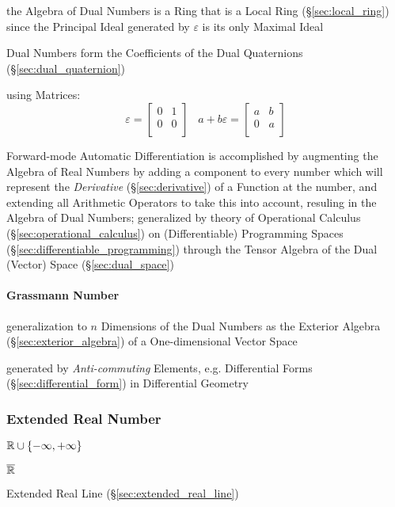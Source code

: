 the Algebra of Dual Numbers is a Ring that is a Local Ring
(\S\ref{sec:local_ring}) since the Principal Ideal generated by $\varepsilon$ is
its only Maximal Ideal

Dual Numbers form the Coefficients of the Dual Quaternions
(\S\ref{sec:dual_quaternion})

using Matrices:
\[
  \varepsilon = \begin{bmatrix}
    0 & 1 \\
    0 & 0 \\
  \end{bmatrix}
  \;\;\;
  a + b\varepsilon = \begin{bmatrix}
    a & b \\
    0 & a \\
  \end{bmatrix}
\]

Forward-mode Automatic Differentiation is accomplished by augmenting the Algebra
of Real Numbers by adding a component to every number which will represent the
\emph{Derivative} (\S\ref{sec:derivative}) of a Function at the number, and
extending all Arithmetic Operators to take this into account, resuling in the
Algebra of Dual Numbers; generalized by theory of Operational Calculus
(\S\ref{sec:operational_calculus}) on (Differentiable) Programming Spaces
(\S\ref{sec:differentiable_programming}) through the Tensor Algebra of the Dual
(Vector) Space (\S\ref{sec:dual_space})



\paragraph{Grassmann Number}\label{sec:grassmann_number}\hfill

generalization to $n$ Dimensions of the Dual Numbers as the Exterior Algebra
(\S\ref{sec:exterior_algebra}) of a One-dimensional Vector Space

generated by \emph{Anti-commuting} Elements, e.g. Differential Forms
(\S\ref{sec:differential_form}) in Differential Geometry



\subsubsection{Extended Real Number}\label{sec:extended_real}

$\mathbb{R} \cup \{-\infty, +\infty\}$

$\overline{\mathbb{R}}$

Extended Real Line (\S\ref{sec:extended_real_line})

